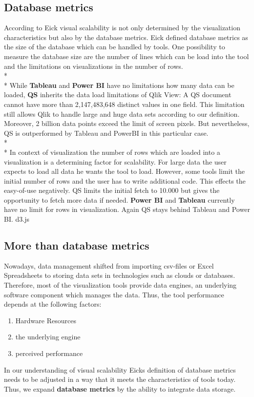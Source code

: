\subsection{Database metrics}
According to Eick visual scalability is not only determined by the visualization characteristics but also by the database metrics. Eick defined database metrics as the size of the database which can be handled by tools\cite{Eick2002}. One possibility to measure the database size are the number of lines which can be load into the tool and the limitations on visualizations in the number of rows.\\*\\*
While \textbf{Tableau} and \textbf{Power BI} have no limitations how many data can be loaded, \textbf{QS} inherits the data load limitations of Qlik View: A QS document cannot have more than 2,147,483,648 distinct values in one field. This limitation still allows Qlik to handle large and huge data sets according to our definition. Moreover, 2 billion data points exceed the limit of screen pixels. But nevertheless, QS is outperformed by Tableau and PowerBI in this particular case.
\\*\\*
In context of visualization the number of rows which are loaded into a visualization is a determining factor for scalability. For large data the user expects to load all data he wants the tool to load. However, some tools limit the initial number of rows and the user has to write additional code. This effects the easy-of-use negatively.
QS limits the initial fetch to 10.000 but gives the opportunity to fetch more data if needed. \textbf{Power BI} and \textbf{Tableau} currently have no limit for rows in visualization.
Again QS stays behind Tableau and Power BI.
d3.js 

\subsection*{More than database metrics}
Nowadays, data management shifted from importing csv-files or Excel Spreadsheets to storing data sets in technologies such as clouds or databases. 
Therefore, most of the visualization tools provide data engines, an underlying software component which manages the data. Thus, the tool performance depends at the following factors:
\begin{enumerate}
    \item Hardware Resources
    \item the underlying engine
    \item perceived performance 
\end{enumerate}
In our understanding of visual scalability Eicks definition of database metrics needs to be adjusted in a way that it meets the characteristics of tools today. Thus, we expand \textbf{database metrics} by the ability to integrate data storage.

